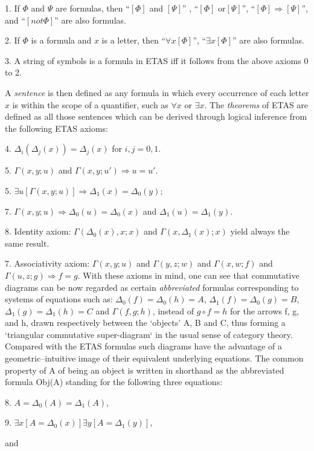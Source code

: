 \documentclass[12pt]{article}
\theoremstyle{plain}
\theoremstyle{definition}
\numberwithin{equation}{section}
\begin{document}
1. If $\Phi$ and $\Psi$ are formulas, then ``$[\Phi]$ and $[\Psi]$'' , ``$[\Phi]$ or$[\Psi]$'', ``$[\Phi] \Rightarrow [\Psi]$'', and ``$[not \Phi]$''  are also formulas.

2. If $\Phi$ is a formula and $x$ is a letter, then ``$ \forall x[\Phi]$'', 
``$ \exists x[\Phi]$'' are also formulas.

3. A string of symbols is a formula in ETAS iff it follows from the above axioms 0 to 2.

A \emph{sentence} is then defined as any formula in which every occurrence of each letter $x$ is within the scope of a quantifier, such as $\forall x$  or $\exists x $.  The \emph{theorems} of ETAS are defined as all those sentences which can be derived through logical inference from the following ETAS axioms:

4. $\Delta_i(\Delta_j(x))=\Delta_j(x)$ for  $i,j = 0, 1$. 

5. $\Gamma(x,y;u)$ and $\Gamma(x,y;u')\Rightarrow u = u'$.

5. $ \exists u [\Gamma(x,y;u)] \Rightarrow \Delta_1(x) =  \Delta_0(y)$;

7. $\Gamma(x,y;u) \Rightarrow \Delta_0(u) =  \Delta_0(x)$ and $\Delta_1(u) =  \Delta_1(y)$.

8. Identity axiom:
$ \Gamma(\Delta_0 (x), x;x)$ and  $ \Gamma(x, \Delta_1 (x);x)$  yield always the same result.

7. Associativity axiom: $\Gamma(x,y;u)$ and $\Gamma(y,z;w)$ and $\Gamma(x,w;f)$ and $\Gamma(u,z;g)\Rightarrow f = g $.
With these axioms in mind, one can see that commutative diagrams can be now regarded as certain 
\textit{abbreviated} formulas corresponding to systems of equations such as:  
$\Delta_0(f) = \Delta_0(h) = A$, $\Delta_1(f) = \Delta_0(g) = B$, $\Delta_1(g) = \Delta_1(h) = C$ 
and $\Gamma(f,g;h)$, instead of $g\circ f = h$ for the arrows f, g, and h, drawn respectively between the 
`objects' A, B and C, thus forming a `triangular commutative super-diagram` in the usual sense of category theory. Compared with the ETAS formulas such diagrams have the advantage of a geometric--intuitive image of their equivalent underlying equations. The common property of A of being an object is written in shorthand as the abbreviated formula Obj(A) standing for the following three equations:

8. $A = \Delta_0(A) = \Delta_1(A)$,

9. $ \exists x[A = \Delta_0 (x)] \exists y[A = \Delta_1 (y)]$,

and 
\end{document}
